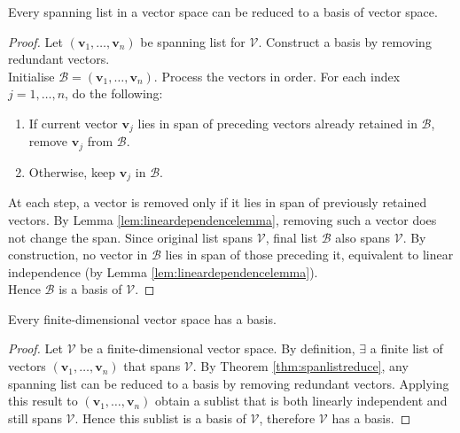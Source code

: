 \begin{theorem} \label{thm:spanlistreduce} Every spanning list in a vector space can be reduced to a basis of vector space.
\begin{proof} Let $(\mathbf{v}_1, \ldots, \mathbf{v}_n)$ be spanning list for $\mathcal{V}$. Construct a basis by removing redundant vectors.\\
Initialise $\mathcal{B} = (\mathbf{v}_1, \ldots, \mathbf{v}_n)$. Process the vectors in order. For each index $j = 1, \ldots, n$, do the following:
\begin{enumerate}[label=\roman*.]
\setlength{\itemsep}{0pt}
\item If current vector $\mathbf{v}_j$ lies in span of preceding vectors already retained in $\mathcal{B}$, remove $\mathbf{v}_j$ from $\mathcal{B}$.
\item Otherwise, keep $\mathbf{v}_j$ in $\mathcal{B}$.
\end{enumerate}
At each step, a vector is removed only if it lies in span of previously retained vectors. By Lemma \ref{lem:lineardependencelemma}, removing such a vector does not change the span. Since original list spans $\mathcal{V}$, final list $\mathcal{B}$ also spans $\mathcal{V}$. By construction, no vector in $\mathcal{B}$ lies in span of those preceding it, equivalent to linear independence (by Lemma \ref{lem:lineardependencelemma}).\\
Hence $\mathcal{B}$ is a basis of $\mathcal{V}$.
\end{proof}
\end{theorem}

\begin{corollary} Every finite-dimensional vector space has a basis.
\begin{proof} Let $\mathcal{V}$ be a finite-dimensional vector space. By definition, $\exists$ a finite list of vectors $(\mathbf{v}_1, \ldots, \mathbf{v}_n)$ that spans $\mathcal{V}$. By Theorem \ref{thm:spanlistreduce}, any spanning list can be reduced to a basis by removing redundant vectors. Applying this result to $(\mathbf{v}_1, \ldots, \mathbf{v}_n)$ obtain a sublist that is both linearly independent and still spans $\mathcal{V}$. Hence this sublist is a basis of $\mathcal{V}$, therefore $\mathcal{V}$ has a basis.
\end{proof}
\end{corollary}

